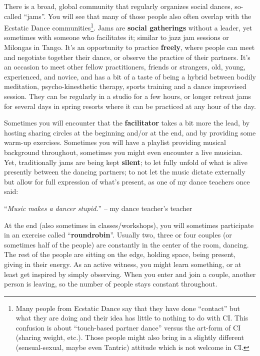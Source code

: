 There is a broad, global community that regularly organizes social dances, so-called ``\gls{jam}s''.
You will see that many of those people also often overlap with the Ecstatic Dance communities\footnote{Many people from Ecstatic Dance say that they have done ``contact'' but what they are doing and their idea has little to nothing to do with CI. This confusion is about ``touch-based partner dance'' versus the art-form of CI (sharing weight, etc.). Those people might also bring in a slightly different (sensual-sexual, maybe even Tantric) attitude which is not welcome in CI.}.
Jams are \textbf{social gatherings} without a leader, yet sometimes with someone who facilitates it; similar to jazz jam sessions or Milongas in Tango.
It's an opportunity to practice \textbf{freely}, where people can meet and negotiate together their dance, or observe the practice of their partners.
It's an occasion to meet other fellow practitioners, friends or strangers, old, young, experienced, and novice, and has a bit of a taste of being a hybrid between bodily meditation, psycho-kinesthetic therapy, sports training and a dance improvised session.
They can be regularly in a studio for a few hours, or longer retreat jams for several days in spring resorts where it can be practiced at any hour of the day.

Sometimes you will encounter that the \textbf{facilitator} takes a bit more the lead, by hosting sharing circles at the beginning and/or at the end, and by providing some warm-up exercises.
Sometimes you will have a playlist providing musical background throughout, sometimes you might even encounter a live musician.
Yet, traditionally jams are being kept \textbf{silent}; to let fully unfold of what is alive presently between the dancing partners; to not let the music dictate externally but allow for full expression of what's present, as one of my dance teachers once said:

\begin{displayquote}
	``\textit{Music makes a dancer stupid.}'' -- my dance teacher's teacher
\end{displayquote}

At the end (also sometimes in classes/workshops), you will sometimes participate in an exercise called ``\textbf{\gls{roundrobin}}''.
Usually two, three or four couples (or sometimes half of the people) are constantly in the center of the room, dancing.
The rest of the people are sitting on the edge, holding space, being present, giving in their energy.
As an active witness, you might learn something, or at least get inspired by simply observing.
When you enter and join a couple, another person is leaving, so the number of people stays constant throughout.

